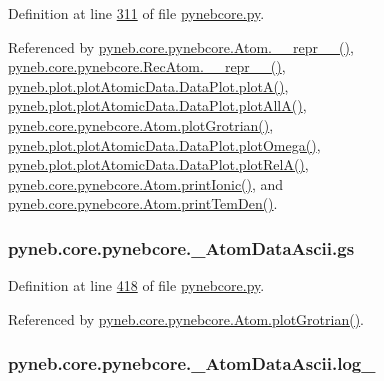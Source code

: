 Definition at line \hyperlink{pynebcore_8py_source_l00311}{311} of file \hyperlink{pynebcore_8py_source}{pynebcore.\-py}.



Referenced by \hyperlink{pynebcore_8py_source_l02615}{pyneb.\-core.\-pynebcore.\-Atom.\-\_\-\-\_\-repr\-\_\-\-\_\-()}, \hyperlink{pynebcore_8py_source_l03154}{pyneb.\-core.\-pynebcore.\-Rec\-Atom.\-\_\-\-\_\-repr\-\_\-\-\_\-()}, \hyperlink{plot_atomic_data_8py_source_l00117}{pyneb.\-plot.\-plot\-Atomic\-Data.\-Data\-Plot.\-plot\-A()}, \hyperlink{plot_atomic_data_8py_source_l00189}{pyneb.\-plot.\-plot\-Atomic\-Data.\-Data\-Plot.\-plot\-All\-A()}, \hyperlink{pynebcore_8py_source_l02443}{pyneb.\-core.\-pynebcore.\-Atom.\-plot\-Grotrian()}, \hyperlink{plot_atomic_data_8py_source_l00373}{pyneb.\-plot.\-plot\-Atomic\-Data.\-Data\-Plot.\-plot\-Omega()}, \hyperlink{plot_atomic_data_8py_source_l00262}{pyneb.\-plot.\-plot\-Atomic\-Data.\-Data\-Plot.\-plot\-Rel\-A()}, \hyperlink{pynebcore_8py_source_l02233}{pyneb.\-core.\-pynebcore.\-Atom.\-print\-Ionic()}, and \hyperlink{pynebcore_8py_source_l02324}{pyneb.\-core.\-pynebcore.\-Atom.\-print\-Tem\-Den()}.

\hypertarget{classpyneb_1_1core_1_1pynebcore_1_1___atom_data_ascii_aed6d711337dfb385d65306e7f3c4d06d}{
\subsubsection[{gs}]{\setlength{\rightskip}{0pt plus 5cm}pyneb.\-core.\-pynebcore.\-\_\-\-Atom\-Data\-Ascii.\-gs}}\label{classpyneb_1_1core_1_1pynebcore_1_1___atom_data_ascii_aed6d711337dfb385d65306e7f3c4d06d}


Definition at line \hyperlink{pynebcore_8py_source_l00418}{418} of file \hyperlink{pynebcore_8py_source}{pynebcore.\-py}.



Referenced by \hyperlink{pynebcore_8py_source_l02443}{pyneb.\-core.\-pynebcore.\-Atom.\-plot\-Grotrian()}.

\hypertarget{classpyneb_1_1core_1_1pynebcore_1_1___atom_data_ascii_aaddba4bcc59a7a5e69c08b2545939737}{
\subsubsection[{log\-\_\-}]{\setlength{\rightskip}{0pt plus 5cm}pyneb.\-core.\-pynebcore.\-\_\-\-Atom\-Data\-Ascii.\-log\-\_\-}}\label{classpyneb_1_1core_1_1pynebcore_1_1___atom_data_ascii_aaddba4bcc59a7a5e69c08b2545939737}


